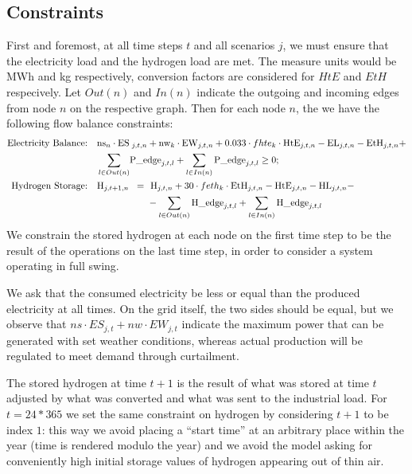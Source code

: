 \documentclass[english]{article}
\numberwithin{definition}{section}
\numberwithin{theorem}{section}
\numberwithin{problem}{section}
\begin{document}
\subsection{Constraints}
First and foremost, at all time steps $t$ and all scenarios $j$, we must ensure that the electricity load and the hydrogen load are met. The measure units would be MWh and kg respectively, conversion factors are considered for $HtE$ and $EtH$ respecively.
Let $Out(n)$ and $In(n)$ indicate the outgoing and incoming edges from node $n$ on the respective graph. Then for each node $n$, the we have the following flow balance constraints:
\begin{align*}
    \text{Electricity Balance:} \quad & \text{ns}_n \cdot \text{ES}\hspace{-1em}&_{j,t,n}&+ \text{nw}_k \cdot \text{EW}_{j,t,n} + 0.033 \cdot fhte_k \cdot \text{HtE}_{j,t,n} - \text{EL}_{j,t,n} - \text{EtH}_{j,t,n} + \\
    & \sum_{l\in Out(n)}\hspace{-1em}& \text{P\_e}&\text{dge}_{j,t,l} + \sum_{l\in In(n)} \text{P\_edge}_{j,t,l} \ge 0;\\
    \text{Hydrogen Storage:} \quad & \text{H}_{j,t+1,n} \hspace{-1em}&=\ & \text{ H}_{j,t,n} + 30 \cdot feth_k \cdot \text{EtH}_{j,t,n} - \text{HtE}_{j,t,n} - \text{HL}_{j,t,n} -\\ &&& - \sum_{l\in Out(n)}\text{H\_edge}_{j,t,l} + \sum_{l\in In(n)}\text{H\_edge}_{j,t,l}
\end{align*}
We constrain the stored hydrogen at each node on the first time step to be the result of the operations on the last time step, in order to consider a system operating in full swing.


We ask that the consumed electricity be less or equal than the produced electricity at all times. On the grid itself, the two sides should be equal, but we observe that $ns\cdot ES_{j,t} + nw\cdot EW_{j,t}$ indicate the maximum power that can be generated with set weather conditions, whereas actual production will be regulated to meet demand through curtailment.

The stored hydrogen at time $t+1$ is the result of what was stored at time $t$ adjusted by what was converted and what was sent to the industrial load. For $t=24*365$ we set the same constraint on hydrogen by considering $t+1$ to be index $1$: this way we avoid placing a ``start time'' at an arbitrary place within the year (time is rendered modulo the year) and we avoid the model asking for conveniently high initial storage values of hydrogen appearing out of thin air.
\end{document}
